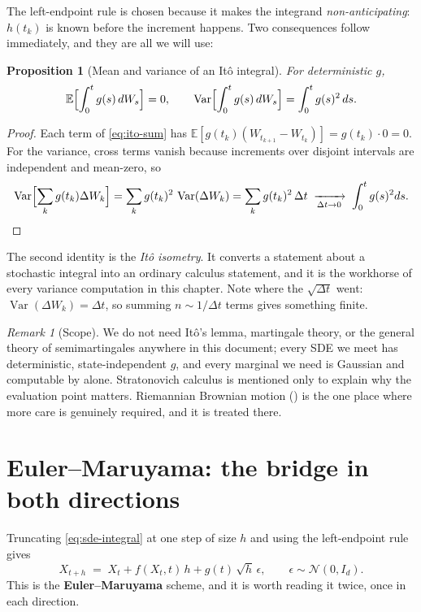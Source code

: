 \documentclass[11pt,a4paper]{report}
\newtheorem{proposition}[proposition]{Proposition}
\theoremstyle{definition}
\theoremstyle{remark}
\newtheorem{remark}[remark]{Remark}
\DeclareMathOperator{\Var}{Var}
\newcommand{\EE}{\mathbb E}
\begin{document}
The left-endpoint rule is chosen because it makes the integrand
\emph{non-anticipating}: $h(t_k)$ is known before the increment happens. Two
consequences follow immediately, and they are all we will use:

\begin{proposition}[Mean and variance of an It\^o integral]
\label{prop:ito-isometry}
For deterministic $g$,
\begin{equation}
\EE\Bigl[\int_0^t g(s)\,dW_s\Bigr]=0,
\qquad
\Var\Bigl[\int_0^t g(s)\,dW_s\Bigr]=\int_0^t g(s)^2\,ds .
\end{equation}
\end{proposition}

\begin{proof}
Each term of \eqref{eq:ito-sum} has $\EE[g(t_k)(W_{t_{k+1}}-W_{t_k})]
= g(t_k)\cdot0 = 0$. For the variance, cross terms vanish because
increments over disjoint intervals are independent and mean-zero, so
\[
\Var\Bigl[\sum_k g(t_k)\Delta W_k\Bigr]
= \sum_k g(t_k)^2\,\Var(\Delta W_k)
= \sum_k g(t_k)^2\,\Delta t
\;\xrightarrow[\Delta t\to0]{}\;\int_0^t g(s)^2ds . \qedhere
\]
\end{proof}

The second identity is the \emph{It\^o isometry}. It converts a statement
about a stochastic integral into an ordinary calculus statement, and it is
the workhorse of every variance computation in this chapter. Note where the
$\sqrt{\Delta t}$ went: $\Var(\Delta W_k)=\Delta t$, so summing $n\sim
1/\Delta t$ terms gives something finite.

\begin{remark}[Scope]
\label{rem:sde-scope}
We do not need It\^o's lemma, martingale theory, or the general theory of
semimartingales anywhere in this document; every SDE we meet has
deterministic, state-independent $g$, and every marginal we need is Gaussian
and computable by  alone. Stratonovich calculus is
mentioned only to explain why the evaluation point matters. Riemannian
Brownian motion () is the one place where more care
is genuinely required, and it is treated there.
\end{remark}

\section{Euler--Maruyama: the bridge in both directions}
\label{sec:sde-euler-maruyama}

Truncating \eqref{eq:sde-integral} at one step of size $h$ and using the
left-endpoint rule gives
\begin{equation}
\label{eq:euler-maruyama}
\boxed{\;X_{t+h} \;=\; X_t + f(X_t,t)\,h + g(t)\,\sqrt{h}\,\epsilon,
\qquad \epsilon\sim\mathcal N(0,I_d).\;}
\end{equation}
This is the \textbf{Euler--Maruyama} scheme, and it is worth reading it
twice, once in each direction.
\end{document}
